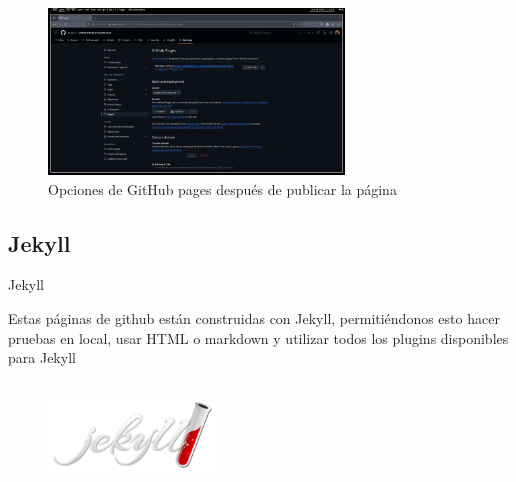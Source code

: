 \documentclass{beamer}
\begin{document}
\begin{frame}

    \begin{figure}[H]
        \centering
        \includegraphics[width=0.7\textwidth]{../Images/github_pages_deploy.png}
        \caption{Opciones de GitHub pages después de publicar la página}
    \end{figure}

\end{frame}
\subsection{Jekyll}

\begin{frame}{Jekyll}

    Estas páginas de github están construidas con Jekyll, permitiéndonos esto hacer pruebas en local, usar HTML o markdown y utilizar todos los plugins disponibles para Jekyll

    \vspace{1cm}
    \begin{columns}
        \begin{figure}[H]
            \centering
            \includegraphics[width=0.4\textwidth]{../Images/jekyll.png}

        \end{figure}
    \end{columns}

\end{frame}
\end{document}
